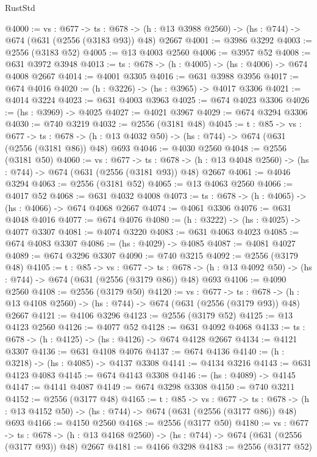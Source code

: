 \begin{lexlean}{RustStd}
\begin{coremodule}
@4000 := {vs : @677} ->
  {ts : @678} -> (h : @13 @3988 @2560) -> (hs : @744) -> @674 (@631 (@2556 (@3183 @93)) @48) @2667
@4001 := @3986 @3292
@4003 := @2556 (@3183 @52)
@4005 := @13 @4003 @2560
@4006 := @3957 @52
@4008 := @631 @3972 @3948
@4013 := {ts : @678} -> (h : @4005) -> (hs : @4006) -> @674 @4008 @2667
@4014 := @4001 @3305
@4016 := @631 @3988 @3956
@4017 := @674 @4016
@4020 := (h : @3226) -> (hs : @3965) -> @4017 @3306
@4021 := @4014 @3224
@4023 := @631 @4003 @3963
@4025 := @674 @4023 @3306
@4026 := (hs : @3969) -> @4025
@4027 := @4021 @3967
@4029 := @674 @3294 @3306
@4030 := @740 @3219
@4032 := @2556 (@3181 @48)
@4045 := {t : @85} ->
  {vs : @677} ->
  {ts : @678} -> (h : @13 @4032 @50) -> (hs : @744) -> @674 (@631 (@2556 (@3181 @86)) @48) @693
@4046 := @4030 @2560
@4048 := @2556 (@3181 @50)
@4060 := {vs : @677} ->
  {ts : @678} -> (h : @13 @4048 @2560) -> (hs : @744) -> @674 (@631 (@2556 (@3181 @93)) @48) @2667
@4061 := @4046 @3294
@4063 := @2556 (@3181 @52)
@4065 := @13 @4063 @2560
@4066 := @4017 @52
@4068 := @631 @4032 @4008
@4073 := {ts : @678} -> (h : @4065) -> (hs : @4066) -> @674 @4068 @2667
@4074 := @4061 @3306
@4076 := @631 @4048 @4016
@4077 := @674 @4076
@4080 := (h : @3222) -> (hs : @4025) -> @4077 @3307
@4081 := @4074 @3220
@4083 := @631 @4063 @4023
@4085 := @674 @4083 @3307
@4086 := (hs : @4029) -> @4085
@4087 := @4081 @4027
@4089 := @674 @3296 @3307
@4090 := @740 @3215
@4092 := @2556 (@3179 @48)
@4105 := {t : @85} ->
  {vs : @677} ->
  {ts : @678} -> (h : @13 @4092 @50) -> (hs : @744) -> @674 (@631 (@2556 (@3179 @86)) @48) @693
@4106 := @4090 @2560
@4108 := @2556 (@3179 @50)
@4120 := {vs : @677} ->
  {ts : @678} -> (h : @13 @4108 @2560) -> (hs : @744) -> @674 (@631 (@2556 (@3179 @93)) @48) @2667
@4121 := @4106 @3296
@4123 := @2556 (@3179 @52)
@4125 := @13 @4123 @2560
@4126 := @4077 @52
@4128 := @631 @4092 @4068
@4133 := {ts : @678} -> (h : @4125) -> (hs : @4126) -> @674 @4128 @2667
@4134 := @4121 @3307
@4136 := @631 @4108 @4076
@4137 := @674 @4136
@4140 := (h : @3218) -> (hs : @4085) -> @4137 @3308
@4141 := @4134 @3216
@4143 := @631 @4123 @4083
@4145 := @674 @4143 @3308
@4146 := (hs : @4089) -> @4145
@4147 := @4141 @4087
@4149 := @674 @3298 @3308
@4150 := @740 @3211
@4152 := @2556 (@3177 @48)
@4165 := {t : @85} ->
  {vs : @677} ->
  {ts : @678} -> (h : @13 @4152 @50) -> (hs : @744) -> @674 (@631 (@2556 (@3177 @86)) @48) @693
@4166 := @4150 @2560
@4168 := @2556 (@3177 @50)
@4180 := {vs : @677} ->
  {ts : @678} -> (h : @13 @4168 @2560) -> (hs : @744) -> @674 (@631 (@2556 (@3177 @93)) @48) @2667
@4181 := @4166 @3298
@4183 := @2556 (@3177 @52)

\end{coremodule}
\end{lexlean}
